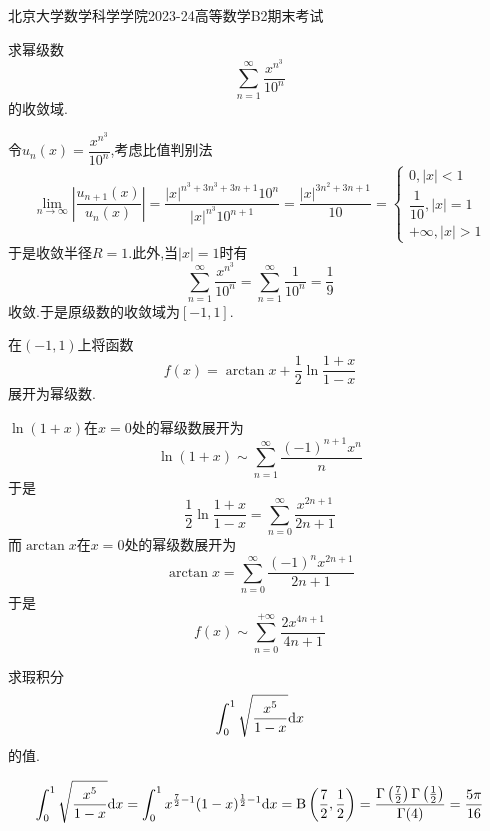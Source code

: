 \documentclass{ctexart}
\begin{document}
\pagestyle{empty}
\begin{center}\Large
    北京大学数学科学学院2023-24高等数学B2期末考试
\end{center}
\begin{problem}[1.(10\songti{分})]
    求幂级数
    \[\sum_{n=1}^{\infty}\dfrac{x^{n^3}}{10^n}\]
    的收敛域.

\end{problem}
\begin{solution}
    令$u_n(x)=\dfrac{x^{n^3}}{10^n}$,考虑比值判别法
    \[\lim_{n\to\infty}\left|\dfrac{u_{n+1}(x)}{u_n(x)}\right|
    =\dfrac{|x|^{n^3+3n^3+3n+1}10^{n}}{|x|^{n^3}10^{n+1}}
    =\dfrac{|x|^{3n^2+3n+1}}{10}=\left\{\begin{array}{l}
        0,|x|<1\\\dfrac1{10},|x|=1\\+\infty,|x|>1
    \end{array}\right.\]
    于是收敛半径$R=1$.此外,当$|x|=1$时有
    \[\sum_{n=1}^{\infty}\dfrac{x^{n^3}}{10^n}=\sum_{n=1}^{\infty}\dfrac{1}{10^n}=\dfrac19\]
    收敛.于是原级数的收敛域为$[-1,1]$.

\end{solution}
\begin{problem}[2.(10\songti{分})]
    在$(-1,1)$上将函数
    \[f(x)=\arctan x+\dfrac12\ln\dfrac{1+x}{1-x}\]
    展开为幂级数.

\end{problem}
\begin{solution}
    $\ln(1+x)$在$x=0$处的幂级数展开为
    \[\ln(1+x)\sim\sum_{n=1}^{\infty}\dfrac{(-1)^{n+1}x^n}{n}\]
    于是
    \[\dfrac12\ln\dfrac{1+x}{1-x}=\sum_{n=0}^{\infty}\dfrac{x^{2n+1}}{2n+1}\]
    而$\arctan x$在$x=0$处的幂级数展开为
    \[\arctan x=\sum_{n=0}^{\infty}\dfrac{(-1)^{n}x^{2n+1}}{2n+1}\]
    于是
    \[f(x)\sim\sum_{n=0}^{+\infty}\dfrac{2x^{4n+1}}{4n+1}\]

\end{solution}
\begin{problem}[3.(10\songti{分})]
    求瑕积分
    \[\int_0^1\sqrt{\dfrac{x^5}{1-x}}\mathrm{d} x\]
    的值.

\end{problem}
\begin{solution}
    \[\int_0^1\sqrt{\dfrac{x^5}{1-x}}\mathrm{d} x
    =\int_0^1x^{\frac72-1}(1-x)^{\frac12-1}\mathrm{d} x
    =\text{B}\left(\dfrac72,\dfrac12\right)
    =\dfrac{\Gamma\left(\frac72\right)\Gamma\left(\frac12\right)}{\Gamma(4)}=\dfrac{5\pi}{16}\]

\end{solution}
\end{document}
